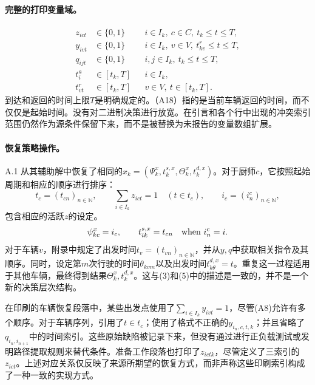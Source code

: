 \documentclass{article}
\begin{document}
\paragraph{完整的打印变量域。}
\begin{align}
z_{ict}&\in\{0,1\}
 &&i\in I_k,\ c\in C,\ t_k\leq t\leq T, \tag{A17}\\
y_{ivt}&\in\{0,1\}
 &&i\in I_k,\ v\in V,\ t_{kv}^r\leq t\leq T, \tag{A18}\\
q_{ijt}&\in\{0,1\}
 &&i,j\in I_k,\ t_k\leq t\leq T, \tag{A19}\\
t_i^a&\in[t_k,T]
 &&i\in I_k, \tag{A20}\\
t_{vt}^r&\in[t_k,T]
 &&v\in V,\ t\in[t_k,T]. \tag{A21}
\end{align}
到达和返回的时间上限\(T\)是明确规定的。（A18）指的是当前车辆返回的时间，而不仅仅是起始时间。没有对二进制决策进行放宽。在引言和各个行中出现的冲突索引范围仍然作为源条件保留下来，而不是被替换为未报告的变量数组扩展。

\paragraph{恢复策略操作。}
A.1 从其辅助解中恢复了相同的\(x_k=(\Psi_k^x,t_k^{s,x},\Theta_k^x,t_k^{d,x})\)。对于厨师\(c\)，它按照起始周期和相应的顺序进行排序：
\[
t_c=(t_{cn})_{n\in\mathbb N},\qquad
\sum_{i\in I_k}z_{ict}=1\quad(t\in t_c),\qquad
i_c=(i_n^c)_{n\in\mathbb N},
\]
包含相应的活跃\(z\)的设定。
\[
\psi_{kc}^x=i_c,\qquad
t_{ik}^{s,x}=t_{cn}\quad\hbox{when }i_n^c=i.
\]
对于车辆\(v\)，附录中规定了出发时间\(t_v=(t_{vn})_{n\in\mathbb N}\)，并从\(y,q\)中获取相关指令及其顺序。同时，设定第\(m\)次行驶的时间\(\theta_{kvm}\)以及出发时间\(t_{k\theta}^{d,x}=t\)。重复这一过程适用于其他车辆，最终得到结果\(\Theta_k^x,t_k^{d,x}\)。这与(3)和(5)中的描述是一致的，并不是一个新的决策层次结构。

在印刷的车辆恢复段落中，某些出发点使用了\(\sum_{i\in I_k}y_{ivt}=1\)，尽管(A8)允许有多个顺序。对于车辆序列，引用了\(t\in t_c\)；使用了格式不正确的\(y_{i_n,c,t,k}\)；并且省略了\(q_{i_n,i_{n+1}}\)中的时间索引。这些原始缺陷被记录下来，但没有通过进行正负载测试或发明路径提取规则来替代条件。准备工作段落也打印了\(z_{ictk}\)，尽管定义了三索引的\(z_{ict}\)。上述对应关系仅反映了来源所期望的恢复方式，而非声称这些印刷索引构成了一种一致的实现方式。
\end{document}

